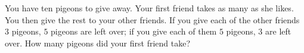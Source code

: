 You have ten pigeons to give away. Your first friend takes as many as she likes. You then give the rest to your other friends. If you give each of the other friends $3$ pigeons, $5$ pigeons are left over; if you give each of them $5$ pigeons, $3$ are left over. How many pigeons did your first friend take?
